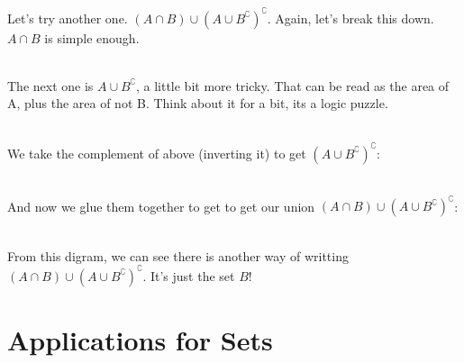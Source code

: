 \myexample
{
	Let's try another one. $(A \cap B) \cup (A \cup B^\complement)^\complement$. Again, let's break this down. $A \cap B$ is simple enough.\\
	\begin{venndiagram2sets}[shade=skyblue,labelNotAB={$\mathcal{U}$}]
		\fillACapB
	\end{venndiagram2sets}\\
	The next one is $A \cup B^\complement$, a little bit more tricky. That can be read as the area of A, plus the area of not B. Think about it for a bit, its a logic puzzle.
	\begin{venndiagram2sets}[shade=skyblue,labelNotAB={$\mathcal{U}$}]
		\fillA \fillNotAorB
	\end{venndiagram2sets}\\
	We take the complement of above (inverting it) to get $(A \cup B^\complement)^\complement$:\\
	\begin{venndiagram2sets}[shade=skyblue,labelNotAB={$\mathcal{U}$}]
		\fillOnlyB
	\end{venndiagram2sets}\\
	And now we glue them together to get to get our union $(A \cap B) \cup (A \cup B^\complement)^\complement$:\\
	\begin{venndiagram2sets}[shade=skyblue,labelNotAB={$\mathcal{U}$}]
		\fillB
	\end{venndiagram2sets}\\
	From this digram, we can see there is another way of writting $(A \cap B) \cup (A \cup B^\complement)^\complement$. It's just the set $B$!
}

\section{Applications for Sets}

